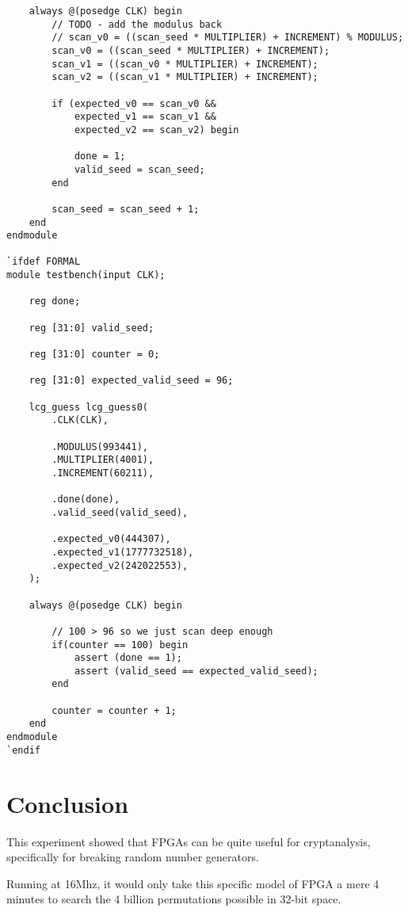 \documentclass{article}
\begin{document}
\begin{lstlisting}
    always @(posedge CLK) begin
        // TODO - add the modulus back
        // scan_v0 = ((scan_seed * MULTIPLIER) + INCREMENT) % MODULUS;
        scan_v0 = ((scan_seed * MULTIPLIER) + INCREMENT);
        scan_v1 = ((scan_v0 * MULTIPLIER) + INCREMENT);
        scan_v2 = ((scan_v1 * MULTIPLIER) + INCREMENT);
        
        if (expected_v0 == scan_v0 &&
            expected_v1 == scan_v1 &&
            expected_v2 == scan_v2) begin
            
            done = 1;
            valid_seed = scan_seed;
        end
        
        scan_seed = scan_seed + 1;
    end
endmodule

`ifdef FORMAL
module testbench(input CLK);
    
    reg done;
    
    reg [31:0] valid_seed;
    
    reg [31:0] counter = 0;
    
    reg [31:0] expected_valid_seed = 96;
    
    lcg_guess lcg_guess0(
        .CLK(CLK),
        
        .MODULUS(993441),
        .MULTIPLIER(4001),
        .INCREMENT(60211),
        
        .done(done),
        .valid_seed(valid_seed),
        
        .expected_v0(444307),
        .expected_v1(1777732518),
        .expected_v2(242022553),
    );
    
    always @(posedge CLK) begin
        
        // 100 > 96 so we just scan deep enough
        if(counter == 100) begin
            assert (done == 1); 
            assert (valid_seed == expected_valid_seed); 
        end
        
        counter = counter + 1;
    end
endmodule
`endif
    \end{lstlisting}   

    \section{Conclusion}

    This experiment showed that FPGAs can be quite useful for
    cryptanalysis, specifically for breaking random number generators.

    Running at 16Mhz, it would only take this specific model of FPGA
    a mere 4 minutes to search the 4 billion permutations possible in
    32-bit space.
\end{document}

